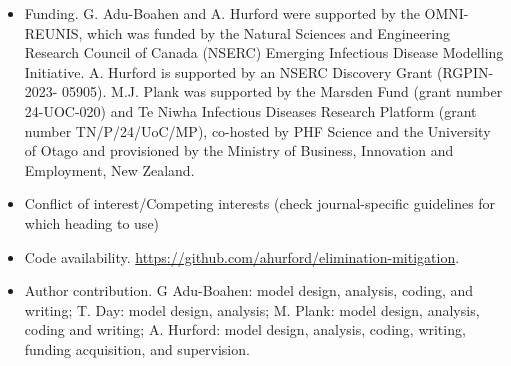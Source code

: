 \documentclass[pdflatex]{sn-jnl}
\theoremstyle{thmstyleone}%
\theoremstyle{thmstyletwo}%
\theoremstyle{thmstylethree}%
\begin{document}
\begin{itemize}
\item Funding. G. Adu-Boahen and A. Hurford were supported by the OMNI-REUNIS, which was funded by the Natural Sciences and Engineering Research Council of Canada (NSERC) Emerging Infectious Disease Modelling Initiative. A. Hurford is supported by an NSERC Discovery Grant (RGPIN-2023- 05905). M.J. Plank was supported by the Marsden Fund (grant number 24-UOC-020) and Te Niwha Infectious Diseases Research Platform (grant number TN/P/24/UoC/MP), co-hosted by PHF Science and the University of Otago and provisioned by the Ministry of Business, Innovation and Employment, New Zealand.
\item Conflict of interest/Competing interests (check journal-specific guidelines for which heading to use)
\item Code availability. \href{https://github.com/ahurford/elimination-mitigation}{https://github.com/ahurford/elimination-mitigation}.
\item Author contribution. G Adu-Boahen: model design, analysis, coding, and writing; T. Day: model design, analysis; M. Plank: model design, analysis, coding and writing; A. Hurford: model design, analysis, coding, writing, funding acquisition, and supervision.   
\end{itemize}



\begin{appendices}
\newpage
\setcounter{page}{1}
\renewcommand{\theequation}{A.\arabic{equation}}
\setcounter{equation}{0}
\renewcommand{\thesection}{A.\arabic{section}}
\setcounter{section}{0}





\end{appendices}
\end{document}
